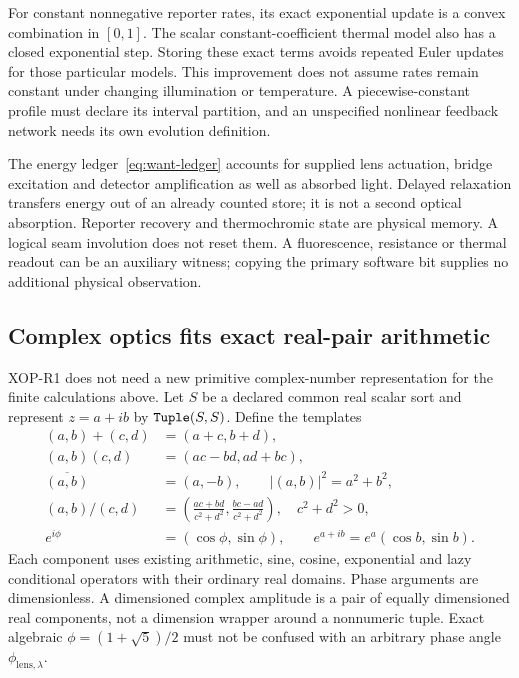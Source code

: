 For constant nonnegative reporter rates, its exact exponential update is a
convex combination in $[0,1]$. The scalar constant-coefficient thermal model
also has a closed exponential step. Storing these exact terms avoids repeated
Euler updates for those particular models. This improvement does not assume
rates remain constant under changing illumination or temperature. A
piecewise-constant profile must declare its interval partition, and an
unspecified nonlinear feedback network needs its own evolution definition.

The energy ledger~\eqref{eq:want-ledger} accounts for supplied lens actuation,
bridge excitation and detector amplification as well as absorbed light.
Delayed relaxation transfers energy out of an already counted store; it is
not a second optical absorption. Reporter recovery and thermochromic state
are physical memory. A logical seam involution does not reset them. A
fluorescence, resistance or thermal readout can be an auxiliary witness;
copying the primary software bit supplies no additional physical observation.

\subsection{Complex optics fits exact real-pair arithmetic}
\label{sec:want-complex}

XOP-R1 does not need a new primitive complex-number representation for the
finite calculations above. Let $S$ be a declared common real scalar sort and
represent $z=a+ib$ by $\texttt{Tuple}(S,S)$. Define the templates
\begin{align}
 (a,b)+(c,d)&=(a+c,b+d),\\
 (a,b)(c,d)&=(ac-bd,ad+bc),\\
 \overline{(a,b)}&=(a,-b),\qquad |(a,b)|^2=a^2+b^2,\\
 (a,b)/(c,d)&=\left(\frac{ac+bd}{c^2+d^2},
                           \frac{bc-ad}{c^2+d^2}\right),
                  \quad c^2+d^2>0,\\
 e^{i\phi}&=(\cos\phi,\sin\phi),\qquad
 e^{a+ib}=e^a(\cos b,\sin b).
 \label{eq:want-complex-pairs}
\end{align}
Each component uses existing arithmetic, sine, cosine, exponential and lazy
conditional operators with their ordinary real domains. Phase arguments are
dimensionless. A dimensioned complex amplitude is a pair of equally
dimensioned real components, not a dimension wrapper around a nonnumeric
tuple. Exact algebraic $\phi=(1+\sqrt5)/2$ must not be confused with an arbitrary
phase angle $\phi_{\mathrm{lens},\lambda}$.

